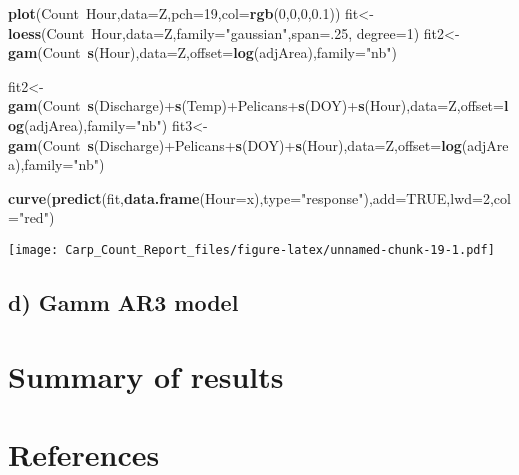 \documentclass[]{article}
\newenvironment{Shaded}{\begin{snugshade}}{\end{snugshade}}
\newcommand{\KeywordTok}[1]{\textcolor[rgb]{0.13,0.29,0.53}{\textbf{{#1}}}}
\newcommand{\DataTypeTok}[1]{\textcolor[rgb]{0.13,0.29,0.53}{{#1}}}
\newcommand{\DecValTok}[1]{\textcolor[rgb]{0.00,0.00,0.81}{{#1}}}
\newcommand{\FloatTok}[1]{\textcolor[rgb]{0.00,0.00,0.81}{{#1}}}
\newcommand{\StringTok}[1]{\textcolor[rgb]{0.31,0.60,0.02}{{#1}}}
\newcommand{\OtherTok}[1]{\textcolor[rgb]{0.56,0.35,0.01}{{#1}}}
\newcommand{\NormalTok}[1]{{#1}}
\begin{document}
\begin{Shaded}
\begin{Highlighting}[]
\KeywordTok{plot}\NormalTok{(Count~Hour,}\DataTypeTok{data=}\NormalTok{Z,}\DataTypeTok{pch=}\DecValTok{19}\NormalTok{,}\DataTypeTok{col=}\KeywordTok{rgb}\NormalTok{(}\DecValTok{0}\NormalTok{,}\DecValTok{0}\NormalTok{,}\DecValTok{0}\NormalTok{,}\FloatTok{0.1}\NormalTok{))}
\NormalTok{fit<-}\KeywordTok{loess}\NormalTok{(Count~Hour,}\DataTypeTok{data=}\NormalTok{Z,}\DataTypeTok{family=}\StringTok{"gaussian"}\NormalTok{,}\DataTypeTok{span=}\NormalTok{.}\DecValTok{25}\NormalTok{, }\DataTypeTok{degree=}\DecValTok{1}\NormalTok{)}
\NormalTok{fit2<-}\KeywordTok{gam}\NormalTok{(Count~}\KeywordTok{s}\NormalTok{(Hour),}\DataTypeTok{data=}\NormalTok{Z,}\DataTypeTok{offset=}\KeywordTok{log}\NormalTok{(adjArea),}\DataTypeTok{family=}\StringTok{"nb"}\NormalTok{)}

\NormalTok{fit2<-}\KeywordTok{gam}\NormalTok{(Count~}\KeywordTok{s}\NormalTok{(Discharge)+}\KeywordTok{s}\NormalTok{(Temp)+Pelicans+}\KeywordTok{s}\NormalTok{(DOY)+}\KeywordTok{s}\NormalTok{(Hour),}\DataTypeTok{data=}\NormalTok{Z,}\DataTypeTok{offset=}\KeywordTok{log}\NormalTok{(adjArea),}\DataTypeTok{family=}\StringTok{"nb"}\NormalTok{)}
\NormalTok{fit3<-}\KeywordTok{gam}\NormalTok{(Count~}\KeywordTok{s}\NormalTok{(Discharge)+Pelicans+}\KeywordTok{s}\NormalTok{(DOY)+}\KeywordTok{s}\NormalTok{(Hour),}\DataTypeTok{data=}\NormalTok{Z,}\DataTypeTok{offset=}\KeywordTok{log}\NormalTok{(adjArea),}\DataTypeTok{family=}\StringTok{"nb"}\NormalTok{)}


\KeywordTok{curve}\NormalTok{(}\KeywordTok{predict}\NormalTok{(fit,}\KeywordTok{data.frame}\NormalTok{(}\DataTypeTok{Hour=}\NormalTok{x),}\DataTypeTok{type=}\StringTok{"response"}\NormalTok{),}\DataTypeTok{add=}\OtherTok{TRUE}\NormalTok{,}\DataTypeTok{lwd=}\DecValTok{2}\NormalTok{,}\DataTypeTok{col=}\StringTok{"red"}\NormalTok{)}
\end{Highlighting}
\end{Shaded}

\texttt{[image: Carp\_Count\_Report\_files/figure-latex/unnamed-chunk-19-1.pdf]}

\subsection{d) Gamm AR3 model}\label{d-gamm-ar3-model}

\section{Summary of results}\label{summary-of-results}

\section{References}\label{references}
\end{document}
